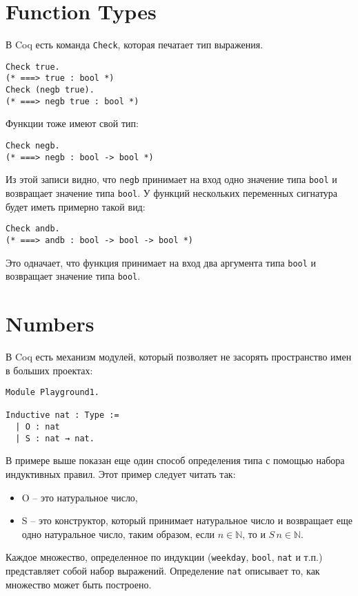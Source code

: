 \documentclass[12pt,a4paper,draft]{article}
\begin{document}
\section{Function Types}
В Coq есть команда \texttt{Check}, которая печатает тип выражения.

\begin{verbatim}
Check true.
(* ===> true : bool *)
Check (negb true).
(* ===> negb true : bool *)
\end{verbatim}

Функции тоже имеют свой тип:

\begin{verbatim}
Check negb.
(* ===> negb : bool -> bool *)
\end{verbatim}

Из этой записи видно, что \texttt{negb} принимает на вход одно значение типа \texttt{bool} и возвращает значение типа \texttt{bool}. У функций нескольких переменных сигнатура будет иметь примерно такой вид:

\begin{verbatim}
Check andb.
(* ===> andb : bool -> bool -> bool *)
\end{verbatim}

Это одначает, что функция принимает на вход два аргумента типа \texttt{bool} и возвращает значение типа \texttt{bool}.

\section{Numbers}

В Coq есть механизм модулей, который позволяет не засорять пространство имен в больших проектах:

\begin{verbatim}
Module Playground1.

Inductive nat : Type :=
  | O : nat
  | S : nat → nat.
\end{verbatim}

В примере выше показан еще один способ определения типа с помощью набора индуктивных правил. Этот пример следует читать так:
\begin{itemize}
	\item O -- это натуральное число,
	\item S -- это конструктор, который принимает натуральное число и возвращает еще одно натуральное число, таким образом, если $n \in \mathbb{N}$, то и $S\, n \in \mathbb{N}$.
\end{itemize}

Каждое множество, определенное по индукции (\texttt{weekday}, \texttt{bool}, \texttt{nat} и т.п.) представляет собой набор выражений. Определение \texttt{nat} описывает то, как множество может быть построено.
\end{document}
